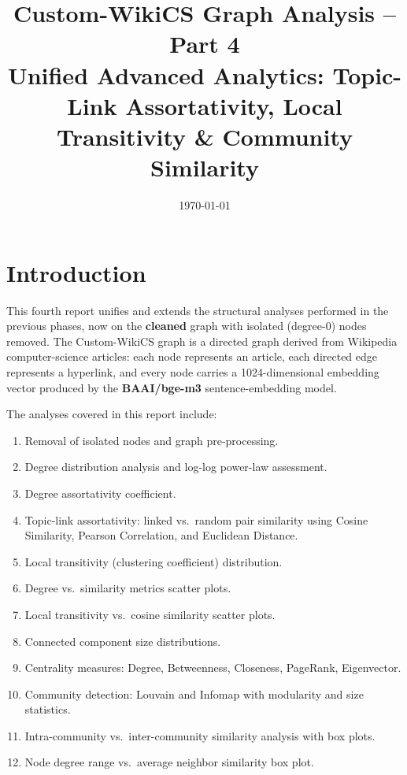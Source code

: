 \documentclass[12pt,a4paper]{article}
\title{Custom-WikiCS Graph Analysis -- Part 4\\[4pt]
\large Unified Advanced Analytics: Topic-Link Assortativity, Local Transitivity \& Community Similarity}
\author{}
\date{\today}
\begin{document}
\maketitle

\section{Introduction}

This fourth report unifies and extends the structural analyses performed in the
previous phases, now on the \textbf{cleaned} graph with isolated (degree-0) nodes
removed.  The Custom-WikiCS graph is a directed graph derived from Wikipedia
computer-science articles: each node represents an article, each directed edge
represents a hyperlink, and every node carries a 1024-dimensional embedding vector
produced by the \textbf{BAAI/bge-m3} sentence-embedding model.

The analyses covered in this report include:
\begin{enumerate}
    \item Removal of isolated nodes and graph pre-processing.
    \item Degree distribution analysis and log-log power-law assessment.
    \item Degree assortativity coefficient.
    \item Topic-link assortativity: linked vs.\ random pair similarity using
          Cosine Similarity, Pearson Correlation, and Euclidean Distance.
    \item Local transitivity (clustering coefficient) distribution.
    \item Degree vs.\ similarity metrics scatter plots.
    \item Local transitivity vs.\ cosine similarity scatter plots.
    \item Connected component size distributions.
    \item Centrality measures: Degree, Betweenness, Closeness, PageRank, Eigenvector.
    \item Community detection: Louvain and Infomap with modularity and size statistics.
    \item Intra-community vs.\ inter-community similarity analysis with box plots.
    \item Node degree range vs.\ average neighbor similarity box plot.
\end{enumerate}
\end{document}
